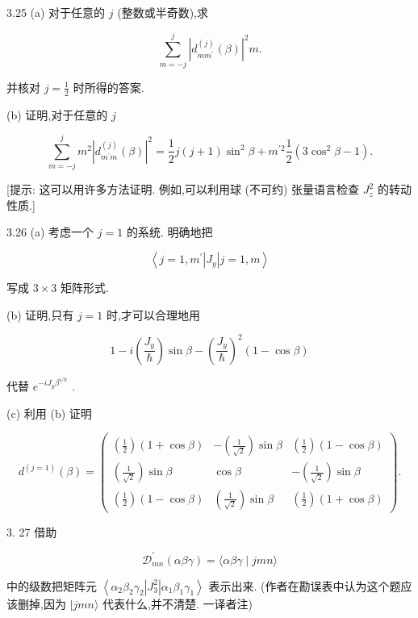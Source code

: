 3.25 (a) 对于任意的 $j$ (整数或半奇数),求

$$
\mathop{\sum }\limits_{{m = - j}}^{j}{\left| {d}_{m{m}^{\prime }}^{\left( j\right) }\left( \beta \right) \right| }^{2}m.
$$

并核对 $j = \frac{1}{2}$ 时所得的答案.

(b) 证明,对于任意的 $j$

$$
\mathop{\sum }\limits_{{m = - j}}^{j}{m}^{2}{\left| {d}_{{m}^{\prime }m}^{\left( j\right) }\left( \beta \right) \right| }^{2} = \frac{1}{2}j\left( {j + 1}\right) {\sin }^{2}\beta + {m}^{\prime 2}\frac{1}{2}\left( {3{\cos }^{2}\beta - 1}\right) .
$$

[提示: 这可以用许多方法证明. 例如,可以利用球 (不可约) 张量语言检查 ${J}_{z}^{2}$ 的转动性质.]

3.26 (a) 考虑一个 $j = 1$ 的系统. 明确地把

$$
\left\langle {j = 1,{m}^{\prime }\left| {J}_{y}\right| j = 1, m}\right\rangle
$$

写成 $3 \times 3$ 矩阵形式.

(b) 证明,只有 $j = 1$ 时,才可以合理地用

$$
1 - i\left( \frac{{J}_{y}}{\hslash }\right) \sin \beta - {\left( \frac{{J}_{y}}{\hslash }\right) }^{2}\left( {1 - \cos \beta }\right)
$$

代替 ${e}^{-i{J}_{y}{\beta }^{i/h}}$ .

(c) 利用 (b) 证明

$$
{d}^{\left( j = 1\right) }\left( \beta \right) = \left( \begin{matrix} \left( \frac{1}{2}\right) \left( {1 + \cos \beta }\right) & - \left( \frac{1}{\sqrt{2}}\right) \sin \beta & \left( \frac{1}{2}\right) \left( {1 - \cos \beta }\right) \\ \left( \frac{1}{\sqrt{2}}\right) \sin \beta & \cos \beta & - \left( \frac{1}{\sqrt{2}}\right) \sin \beta \\ \left( \frac{1}{2}\right) \left( {1 - \cos \beta }\right) & \left( \frac{1}{\sqrt{2}}\right) \sin \beta & \left( \frac{1}{2}\right) \left( {1 + \cos \beta }\right) \end{matrix}\right) .
$$

3. 27 借助

$$
{\mathcal{D}}_{mn}^{\prime }\left( {\alpha \beta \gamma }\right) = \langle {\alpha \beta \gamma } \mid {jmn}\rangle
$$

中的级数把矩阵元 $\left\langle {{\alpha }_{2}{\beta }_{2}{\gamma }_{2}\left| {J}_{3}^{2}\right| {\alpha }_{1}{\beta }_{1}{\gamma }_{1}}\right\rangle$ 表示出来. (作者在勘误表中认为这个题应该删掉,因为 $|{jmn}\rangle$ 代表什么,并不清楚. 一译者注)

